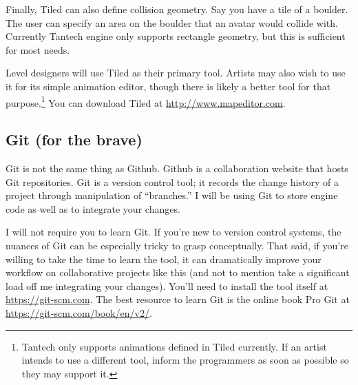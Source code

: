 \documentclass{article}
\begin{document}
Finally, Tiled can also define collision geometry. Say you have a tile of a boulder. The user can specify an area on the boulder that an avatar would collide with. Currently Tantech engine only supports rectangle geometry, but this is sufficient for most needs.

Level designers will use Tiled as their primary tool. Artists may also wish to use it for its simple animation editor, though there is likely a better tool for that purpose.\footnote{Tantech only supports animations defined in Tiled currently. If an artist intends to use a different tool, inform the programmers as soon as possible so they may support it.} You can download Tiled at \url{http://www.mapeditor.com}.

\subsection*{Git (for the brave)}
Git is not the same thing as Github. Github is a collaboration website that hosts Git repositories. Git is a version control tool; it records the change history of a project through manipulation of ``branches.'' I will be using Git to store engine code as well as to integrate your changes.

I will not require you to learn Git. If you're new to version control systems, the nuances of Git can be especially tricky to grasp conceptually. That said, if you're willing to take the time to learn the tool, it can dramatically improve your workflow on collaborative projects like this (and not to mention take a significant load off me integrating your changes). You'll need to install the tool itself at \url{https://git-scm.com}. The best resource to learn Git is the online book Pro Git at \url{https://git-scm.com/book/en/v2/}.
\end{document}

